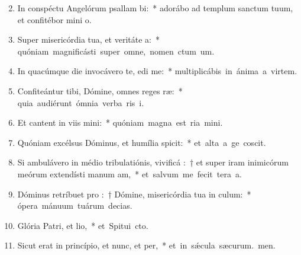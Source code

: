 \begin{flushleft}
\begin{enumerate}[leftmargin=*]
\setcounter{enumi}{1}

\item In conspéctu Angelórum psallam bi:~* adorábo ad templum sanctum tuum, et confitébor mini o.
\item Super misericórdia tua, et veritáte a:~* \mbox{quóniam magnificásti super omne, nomen ctum um.}
\item In quacúmque die invocávero te, edi me:~* \mbox{multiplicábis in ánima a virtem.}
\item Confiteántur tibi, Dómine, omnes reges ræ:~* \mbox{quia audiérunt ómnia verba ris i.}
\item Et cantent in viis mini:~* \mbox{quóniam magna est ria mini.}
\item Quóniam excélsus Dóminus, et humília spicit:~* \mbox{et alta a ge coscit.}
\item Si ambulávero in médio tribulatiónis, vivificá :~† et super iram inimicórum meórum extendísti manum am,~* \mbox{et salvum me fecit tera a.}
\item Dóminus retríbuet pro :~† Dómine, misericórdia tua in culum:~* \mbox{ópera mánuum tuárum  decias.}
\item Glória Patri, et lio,~* \mbox{et Spitui cto.}
\item Sicut erat in princípio, et nunc, et per,~* \mbox{et in s\'{\ae}cula sæcurum. men.}


\end{enumerate}
\end{flushleft}

